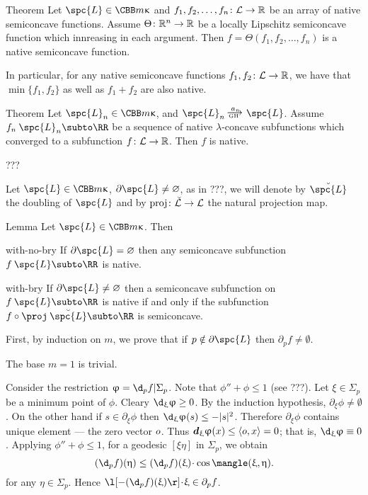 \begin{thm}{Theorem}\label{thm:native-operations}
Let $\spc{L}\in\CBB m\kappa$ 
and $f_1,f_2,\dots,f_n\:\spc{L}\to\RR$ be an array of native semiconcave functions.
Assume $\Theta\:\RR^n\to\RR$ be a locally Lipschitz semiconcave function which innreasing in each argument.
Then $f=\Theta(f_1,f_2,\dots,f_n)$ is a native semiconcave function.

In particular, for any native semiconcave functions $f_1,f_2\:\spc{L}\to\RR$,
we have that $\min\{f_1,f_2\}$ as well as $f_1+f_2$ are also native.
\end{thm}



\begin{thm}{Theorem} Let $\spc{L}_n\in\CBB m\kappa$, and $\spc{L}_n\xGHto{a_n} \spc{L}$.
Assume $f_n\:\spc{L}_n\subto \RR$ be a sequence of native $\lambda$-concave subfunctions which converged to a subfunction $f\:\spc{L}\to\RR$.
Then $f$ is native.
\end{thm}

???
\qeds



Let $\spc{L}\in\CBB m\kappa$, 
$\partial \spc{L}\not=\emptyset$,
as in ???, we will denote by $\breve{\spc{L}}$ the doubling of $\spc{L}$ and by $\proj\:\breve{\spc{L}}\to \spc{L}$ the natural projection map.


\begin{thm}{Lemma} 
Let $\spc{L}\in\CBB m\kappa$. 
Then
\begin{subthm}{with-no-bry} If $\partial \spc{L}=\emptyset$ then any semiconcave subfunction $f\:\spc{L}\subto\RR$ is native.
\end{subthm}

\begin{subthm}{with-bry} If $\partial\spc{L}\not=\emptyset$ then a semiconcave subfunction on $f\:\spc{L}\subto\RR$ 
is native if and only if the subfunction $f\circ\proj\:\breve{\spc{L}}\subto\RR$ is semiconcave.
\end{subthm}
\end{thm}

 First, by induction on $m$, we prove that if $p\notin\partial \spc{L}$ then $\partial_pf\not=\emptyset$.

The base $m=1$ is trivial.

Consider the restriction $\phi=\d_p f|\Sigma_p$.
Note that $\phi''+\phi\le 1$ (see ???).
Let ${\xi}\in \Sigma_p$ be a minimum point of $\phi$.
Cleary $\d_{{\xi}}\phi\ge 0$.
By the induction hypothesis, $\partial_{{\xi}}\phi\not=\emptyset$.
On the other hand if $s\in\partial_\xi\phi$ then $\d_\xi\phi(s)\le -|s|^2$.
Therefore $\partial_{\xi}\phi$ contains unique element --- the zero vector $o$. 
Thus $\d_{{\xi}}\phi(x)\le\<\0,x\>=0$; that is, $\d_{{\xi}}\phi\equiv 0$.
Applying $\phi''+\phi\le 1$, for a geodesic $[\xi\eta]$ in $\Sigma_p$, we obtain 
\[(\d_p f)(\eta)
\le 
(\d_p f)({\xi})
\cdot
\cos\mangle({\xi},\eta).\]
for any $\eta\in \Sigma_p$.
Hence
$\l[-(\d_p f)({\xi})\r]\cdot{\xi}\in\partial_p f$.

